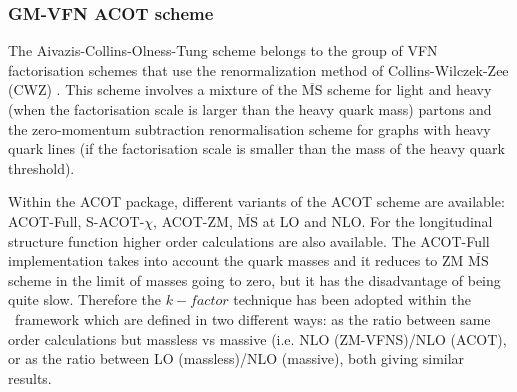 \subsubsection{GM-VFN ACOT scheme}

The Aivazis-Collins-Olness-Tung scheme belongs to the group of VFN 
factorisation schemes that use the renormalization method of 
Collins-Wilczek-Zee (CWZ) \cite{CWZ}.
This scheme involves a mixture of the $\overline{\text{MS}}$ scheme 
for light and heavy (when the factorisation scale is larger than the heavy quark mass) partons
and the zero-momentum subtraction renormalisation scheme for graphs with heavy quark lines 
(if the factorisation scale is smaller than the mass of the heavy quark threshold). 

Within the ACOT package, different variants of the ACOT scheme are available:
ACOT-Full, S-ACOT-$\chi$, ACOT-ZM, $\overline{\text{MS}}$ at LO and NLO. 
For the longitudinal structure function higher order calculations are also available. 
The ACOT-Full implementation takes into account the quark masses 
and it reduces to ZM $\overline{\text{MS}}$ scheme in the limit of masses going to zero, 
but it has the disadvantage of being quite slow.
Therefore the $k-factor$ technique has been adopted within the \fitter\ framework which are  
defined in two different ways:
as the ratio between same order calculations but massless vs massive 
(i.e. NLO (ZM-VFNS)/NLO (ACOT), or as the ratio between LO (massless)/NLO (massive),
both giving similar results.
%
%
%

